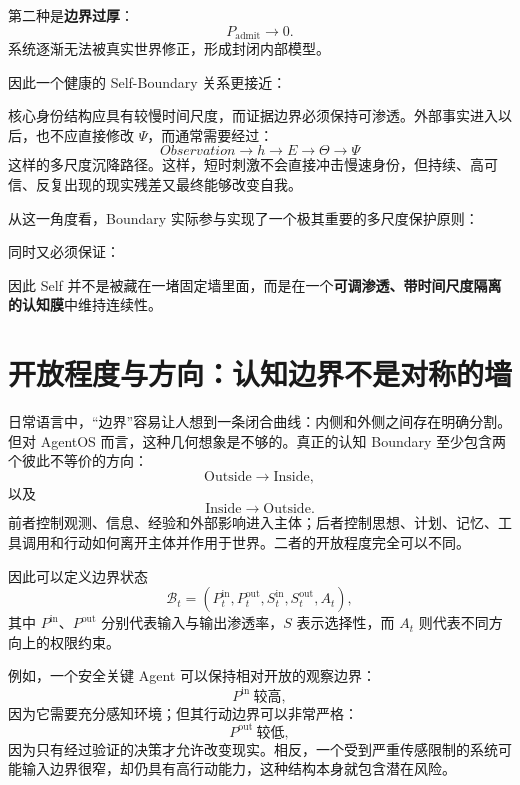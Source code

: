 第二种是\textbf{边界过厚}：
\[
P_{\mathrm{admit}}\to0.
\]
系统逐渐无法被真实世界修正，形成封闭内部模型。

因此一个健康的 Self-Boundary 关系更接近：
\begin{statementbox}
\centering
{}
\end{statementbox}

核心身份结构应具有较慢时间尺度，而证据边界必须保持可渗透。外部事实进入以后，也不应直接修改 $\Psi$，而通常需要经过：
\[
Observation
\rightarrow
h
\rightarrow
E
\rightarrow
\Theta
\rightarrow
\Psi
\]
这样的多尺度沉降路径。这样，短时刺激不会直接冲击慢速身份，但持续、高可信、反复出现的现实残差又最终能够改变自我。

从这一角度看，Boundary 实际参与实现了一个极其重要的多尺度保护原则：
\begin{statementbox}
\centering
{}
\end{statementbox}
同时又必须保证：
\begin{statementbox}
\centering
{}
\end{statementbox}

因此 Self 并不是被藏在一堵固定墙里面，而是在一个\textbf{可调渗透、带时间尺度隔离的认知膜}中维持连续性。


\section{开放程度与方向：认知边界不是对称的墙}

日常语言中，“边界”容易让人想到一条闭合曲线：内侧和外侧之间存在明确分割。但对 AgentOS 而言，这种几何想象是不够的。真正的认知 Boundary 至少包含两个彼此不等价的方向：
\[
\mathrm{Outside}
\rightarrow
\mathrm{Inside},
\]
以及
\[
\mathrm{Inside}
\rightarrow
\mathrm{Outside}.
\]
前者控制观测、信息、经验和外部影响进入主体；后者控制思想、计划、记忆、工具调用和行动如何离开主体并作用于世界。二者的开放程度完全可以不同。

因此可以定义边界状态
\[
\mathcal{B}_t
=
\left(
P^{\mathrm{in}}_t,
P^{\mathrm{out}}_t,
S^{\mathrm{in}}_t,
S^{\mathrm{out}}_t,
A_t
\right),
\]
其中 $P^{\mathrm{in}}$、$P^{\mathrm{out}}$ 分别代表输入与输出渗透率，$S$ 表示选择性，而 $A_t$ 则代表不同方向上的权限约束。

例如，一个安全关键 Agent 可以保持相对开放的观察边界：
\[
P^{\mathrm{in}}\ \text{较高},
\]
因为它需要充分感知环境；但其行动边界可以非常严格：
\[
P^{\mathrm{out}}\ \text{较低},
\]
因为只有经过验证的决策才允许改变现实。相反，一个受到严重传感限制的系统可能输入边界很窄，却仍具有高行动能力，这种结构本身就包含潜在风险。

